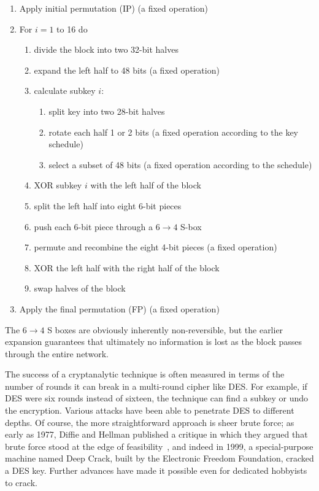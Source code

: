 \begin{enumerate}
\item Apply initial permutation (IP) (a fixed operation)
\item For $i = 1$ to 16 do
  \begin{enumerate}
  \item divide the block into two 32-bit halves
  \item expand the left half to 48 bits (a fixed operation)
  \item calculate subkey $i$:
    \begin{enumerate}
    \item split key into two 28-bit halves
    \item rotate each half 1 or 2 bits (a fixed operation according to
      the key schedule)
    \item select a subset of 48 bits (a fixed operation according to
      the schedule)
    \end{enumerate}
  \item XOR subkey $i$ with the left half of the block
  \item split the left half into eight 6-bit pieces
  \item push each 6-bit piece through a $6\rightarrow 4$ S-box
  \item permute and recombine the eight 4-bit pieces (a fixed operation)
  \item XOR the left half with the right half of the block
  \item swap halves of the block
  \end{enumerate}
\item Apply the final permutation (FP) (a fixed operation)
\end{enumerate}

The $6 \rightarrow 4$ S boxes are obviously inherently non-reversible,
but the earlier expansion guarantees that ultimately no information is
lost as the block passes through the entire network.

  The success of
a cryptanalytic technique is often measured in terms of the number of
rounds it can break in a multi-round cipher like DES.  For example, if
DES were six rounds instead of sixteen, the technique can find a
subkey or undo the encryption.  Various attacks have been able to
penetrate DES to different depths.  Of course, the more
straightforward approach is sheer brute force; as early as 1977,
Diffie and Hellman published a critique in which they argued that
brute force stood at the edge of feasibility~\cite{diffie1977special},
and indeed in 1999, a special-purpose machine named Deep Crack, built
by the Electronic Freedom Foundation, cracked a DES key.  Further
advances have made it possible even for dedicated hobbyists to crack.

